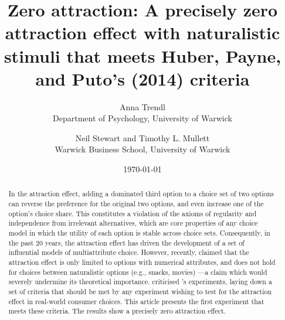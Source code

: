 \documentclass[12pt, a4paper]{article}
\title{}
\author{}
\date{}
\begin{document}
\title{Zero attraction: A precisely zero attraction effect with naturalistic stimuli that meets Huber, Payne, and Puto's (2014) criteria}

\author{Anna Trendl\\Department of Psychology, University of Warwick \and Neil Stewart and Timothy L. Mullett\\Warwick Business School, University of Warwick}

\date{\today}


\begin{titlepage}
\maketitle

\newpage

\begin{abstract}
In the attraction effect, adding a dominated third option to a choice set of two options can reverse the preference for the original two options, and even increase one of the option's choice share. This constitutes a violation of the axioms of regularity and independence from irrelevant alternatives, which are core properties of any choice model in which the utility of each option is stable across choice sets. Consequently, in the past 20 years, the attraction effect has driven the development of a set of influential models of multiattribute choice. However, recently,  claimed that the attraction effect is only limited to options with numerical attributes, and does not hold for choices between naturalistic options (e.g., snacks, movies) ---a claim which would severely undermine its theoretical importance.  criticised \citeauthor{Frederick2014}'s experiments, laying down a set of criteria that should be met by any experiment wishing to test for the attraction effect in real-world consumer choices. This article presents the first experiment that meets these criteria. The results show a precisely zero attraction effect.
\end{abstract}

\end{titlepage}
\end{document}
